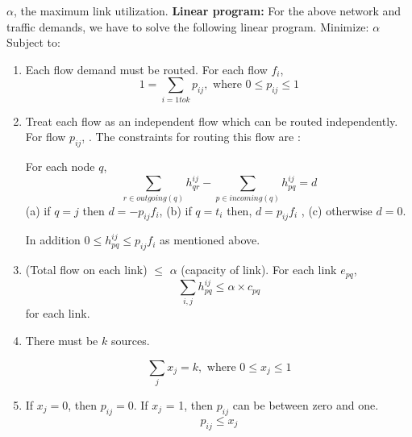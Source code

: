 $\alpha$, the maximum link utilization.
\newline
\newline
\textbf{Linear program:}
For the above network and traffic demands, we have to solve the following linear program.
\newline
\newline
Minimize:  $\alpha$
\newline
\newline
Subject to:
\begin{enumerate}
\item 
Each flow demand must be routed. For each flow $f_i$,
\[ 1 = \sum_{i = 1 to k }  p_{ij}, \mbox{ where } 0 \leq p_{ij} \leq 1 \]

\item 
Treat each flow as an independent flow which can be routed independently. For flow $p_{ij}$, . The constraints for routing this flow are :

For each node $q$,
\[ \sum_{r \in outgoing(q)} h_{qr}^{ij} - \sum_{p \in incoming(q)} h_{pq}^{ij} = d\]
(a)  if $q = j$ then $d = -p_{ij} f_i$, (b) if $q = t_i$ then, $d = p_{ij} f_i$ , (c) otherwise $d = 0$. 

In addition $0 \leq h_{pq}^{ij} \leq p_{ij} f_i $ as mentioned above.

\item
(Total flow on each link) $\leq $ $\alpha $ (capacity of link). For each link $e_{pq}$, 
\[ \sum_{i,j} h_{pq}^{ij} \leq \alpha \times c_{pq} \]
for each link.

\item
There must be $k$ sources.

\[\sum_{j}  x_j = k , \mbox{ where } 0 \leq x_j \leq 1 \]

\item
If $x_j = 0$, then $p_{ij} = 0$. If $x_j$ = 1, then $p_{ij}$ can be between zero and one.
\[ p_{ij} \leq x_j \]

\end{enumerate}
